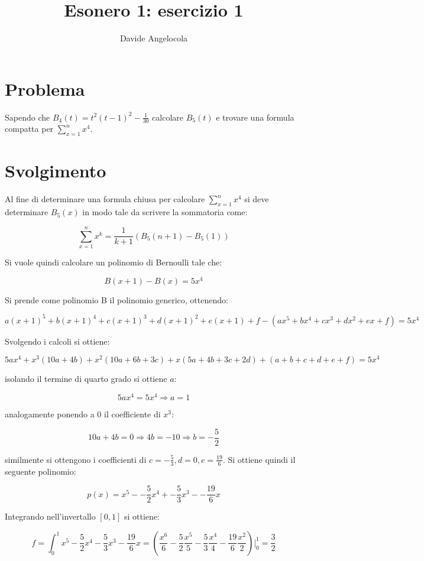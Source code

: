 \documentclass{article}
\title{Esonero 1: esercizio 1}
\author{Davide Angelocola}
\begin{document}
\maketitle

\section{Problema}

Sapendo che $B_4(t) = t^2(t-1)^2 - \frac{1}{30}$ calcolare $B_5(t)$ e trovare una formula compatta per $\sum_{x=1}^{n}{x^4}$.

\section{Svolgimento}

Al fine di determinare una formula chiusa per calcolare $\sum_{x=1}^{n}{x^4}$ si
deve determinare $B_5(x)$ in modo tale da scrivere la sommatoria come:

$$\sum_{x=1}^{n}{x^k} = \frac{1}{k+1} (B_5(n+1) - B_5(1))$$\label{1}

Si vuole quindi calcolare un polinomio di Bernoulli tale che:

$$B(x+1) - B(x) = 5x^4$$

Si prende come polinomio B il polinomio generico, ottenendo:

$$a(x+1)^5+b(x+1)^4+c(x+1)^3+d(x+1)^2+e(x+1)+f - (ax^5+bx^4+cx^3+dx^2+ex+f) = 5x^4$$

Svolgendo i calcoli si ottiene:

$$5ax^4 + x^3(10a+4b) + x^2(10a+6b+3c)+x(5a+4b+3c+2d)+(a+b+c+d+e+f)=5x^4$$ 

isolando il termine di quarto grado si ottiene $a$:

$$5ax^4=5x^4 \Rightarrow a = 1$$

analogamente ponendo a 0 il coefficiente di $x^3$:

$$10a + 4b = 0 \Rightarrow 4b = -10 \Rightarrow b = -\frac{5}{2}$$

similmente si ottengono i coefficienti di $c = -\frac{5}{3}, d = 0, e = \frac{19}{6}$. Si ottiene quindi il seguente polinomio:

$$p(x) = x^5 - -\frac{5}{2}x^4 + -\frac{5}{3}x^3 - -\frac{19}{6}x$$

Integrando nell'invertallo $[0, 1]$ si ottiene:

$$f = \int_0^1{x^5 -\frac{5}{2}x^4 -\frac{5}{3}x^3 -\frac{19}{6}x} = (\frac{x^6}{6} - \frac{5}{2}\frac{x^5}{5} -\frac{5}{3}\frac{x^4}{4} -  \frac{19}{6}\frac{x^2}{2})|_0^1 = \frac{3}{2}$$ 
\end{document}
